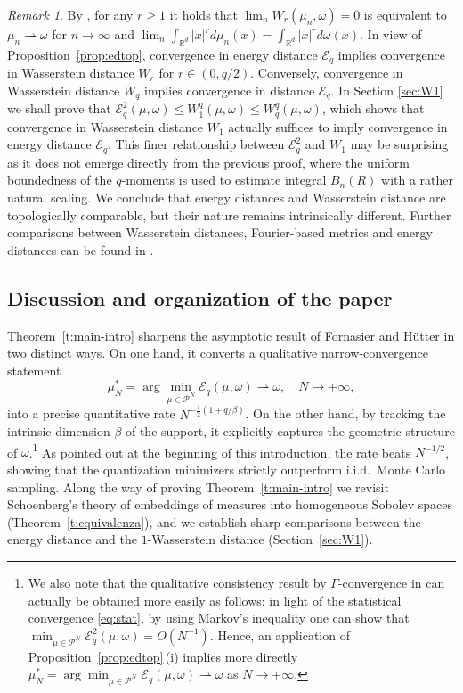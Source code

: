 \documentclass[12pt,a4paper,oneside]{amsart}
\theoremstyle{plain}
\theoremstyle{definition}
\numberwithin{equation}{section}
\numberwithin{figure}{section}
\numberwithin{table}{section}
\theoremstyle{remark}
\newtheorem{remark}[theorem]{Remark}
\newcommand{\R}{\mathbb{R}}
\newcommand{\expAhlfors}{\beta}
\begin{document}
\begin{remark}
By \cite[Proposition 7.1.5]{ambrosio2008gradient}, for any $r \geq 1$ it holds that $\lim_n W_r(\mu_n,\omega)=0$ is equivalent to  $\mu_n \rightharpoonup \omega$ for $n\to \infty$ and $\lim_n \int_{\R^d} |x|^r d\mu_n(x) = \int_{\R^d} |x|^r d\omega(x)$. In view of Proposition~\ref{prop:edtop}, convergence in energy distance $\mathcal E_q$ implies convergence in Wasserstein distance $W_r$ for $r \in (0,q/2)$. Conversely, convergence in Wasserstein distance $W_q$ implies convergence in distance $\mathcal E_q$. In Section \ref{sec:W1} we shall prove that 
$\mathcal E_q^2(\mu,\omega)\leq  W_1^{q}(\mu,\omega)\leq W_q^{q}(\mu,\omega)$, which shows that convergence in Wasserstein distance $W_1$ actually suffices to imply convergence in energy distance $\mathcal E_q$. This finer relationship between $\mathcal E_q^2$ and $W_1$ may be surprising as it does not emerge directly from the previous proof, where the uniform boundedness of the $q$-moments is used to estimate integral $B_n(R)$ with a rather natural scaling.  We conclude that energy distances and Wasserstein distance are topologically comparable, but their nature remains intrinsically different. Further comparisons between Wasserstein distances, Fourier-based metrics and energy
distances can be found in
\cite{Auricchio2020,auricchio2026kinetic}.
\end{remark}


\subsection{Discussion and organization of the paper}

Theorem~\ref{t:main-intro} sharpens the asymptotic result of Fornasier and 
H\"utter \cite{fornasier2014consistency} in two distinct ways. On one hand, 
it converts a qualitative narrow-convergence statement
$$
\mu_N^* = \arg\min_{\mu \in \mathcal P^N} \mathcal{E}_q(\mu,\omega) 
\rightharpoonup \omega, \quad N \to +\infty,
$$
into a precise quantitative rate $N^{-\frac{1}{2}(1+q/\expAhlfors)}$. On the 
other hand, by tracking the intrinsic dimension $\expAhlfors$ of the support, 
it explicitly captures the geometric structure of $\omega$.\footnote{We also 
note that the qualitative consistency result by $\Gamma$-convergence in 
\cite{fornasier2014consistency} can actually be obtained more easily as 
follows: in light of the statistical convergence \eqref{eq:stat}, by using 
Markov's inequality one can show that $\min_{\mu \in \mathcal P^N} 
\mathcal{E}^2_q(\mu,\omega) =O(N^{-1})$. Hence, an application of 
Proposition~\ref{prop:edtop}\,(i) implies more directly $\mu_N^* = 
\arg\min_{\mu \in \mathcal P^N} \mathcal{E}_q(\mu,\omega) \rightharpoonup 
\omega$ as $N \to +\infty$.} As pointed out at the beginning of this 
introduction, the rate beats $N^{-1/2}$, showing that the quantization 
minimizers strictly outperform i.i.d.\ Monte Carlo sampling. Along the way 
of proving Theorem~\ref{t:main-intro} we revisit Schoenberg's theory of 
embeddings of measures into homogeneous Sobolev spaces 
(Theorem~\ref{t:equivalenza}), and we establish sharp comparisons between 
the energy distance and the $1$-Wasserstein distance 
(Section~\ref{sec:W1}).
\end{document}
